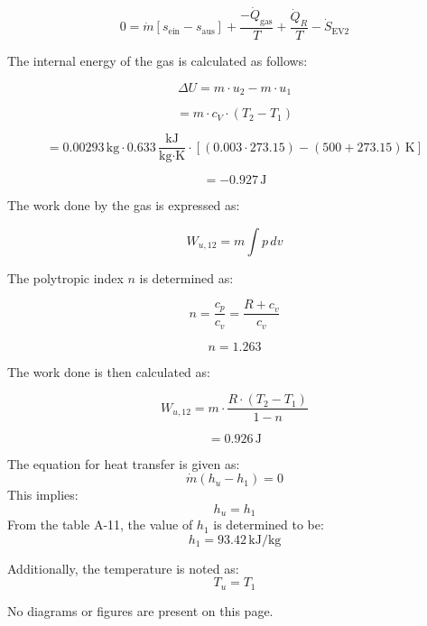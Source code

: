 \[
0 = \dot{m} \left[ s_{\text{ein}} - s_{\text{aus}} \right] + \frac{-\dot{Q}_{\text{gas}}}{T} + \frac{\dot{Q}_{R}}{T} - \dot{S}_{\text{EV2}}
\]

The internal energy of the gas is calculated as follows:

\[
\Delta U = m \cdot u_2 - m \cdot u_1
\]

\[
= m \cdot c_V \cdot (T_2 - T_1)
\]

\[
= 0.00293 \, \text{kg} \cdot 0.633 \, \frac{\text{kJ}}{\text{kg·K}} \cdot \left[ (0.003 \cdot 273.15) - (500 + 273.15) \, \text{K} \right]
\]

\[
= -0.927 \, \text{J}
\]

The work done by the gas is expressed as:

\[
W_{u,12} = m \int p \, dv
\]

The polytropic index \( n \) is determined as:

\[
n = \frac{c_p}{c_v} = \frac{R + c_v}{c_v}
\]

\[
n = 1.263
\]

The work done is then calculated as:

\[
W_{u,12} = m \cdot \frac{R \cdot (T_2 - T_1)}{1 - n}
\]

\[
= 0.926 \, \text{J}
\]

The equation for heat transfer is given as:  
\[
\dot{m} \left( h_u - h_1 \right) = 0
\]  
This implies:  
\[
h_u = h_1
\]  
From the table A-11, the value of \( h_1 \) is determined to be:  
\[
h_1 = 93.42 \, \text{kJ/kg}
\]  

Additionally, the temperature is noted as:  
\[
T_u = T_1
\]  

No diagrams or figures are present on this page.